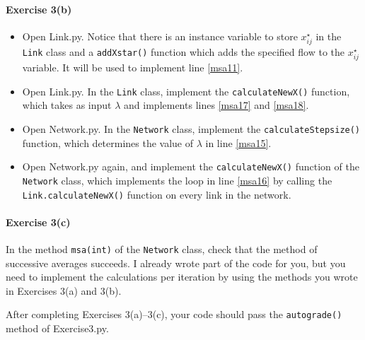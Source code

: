 \documentclass[11pt]{article}
\begin{document}
\paragraph*{Exercise 3(b)} 
\begin{itemize}
	\item Open Link.py. Notice that there is an instance variable to store $x^\star_{ij}$ in the \texttt{Link} class and a \texttt{addXstar()} function which adds the specified flow to the $x^\star_{ij}$ variable.
	It will be used to implement line \ref{msa11}. 
	
	
	
	\item Open Link.py. In the \texttt{Link} class, implement the \texttt{calculateNewX()} function, which takes as input $\lambda$ and implements lines \ref{msa17} and \ref{msa18}. 
	
	\item Open Network.py. In the \texttt{Network} class, implement the \texttt{calculateStepsize()} function, which determines the value of $\lambda$ in line \ref{msa15}. 
	
	\item Open Network.py again, and implement the \texttt{calculateNewX()} function of the \texttt{Network} class, which implements the loop in line \ref{msa16} by calling the \texttt{Link.calculateNewX()} function on every link in the network.
\end{itemize}


\paragraph*{Exercise 3(c)} 

In the method \texttt{msa(int)} of the \texttt{Network} class, check that  the method of successive averages succeeds. I already wrote part of the code for you, but you need to implement the calculations per iteration by using the methods you wrote in Exercises 3(a) and 3(b).


\vspace\baselineskip

	\noindent
	After completing Exercises 3(a)--3(c), your code should pass the \texttt{autograde()} method of Exercise3.py. 
	
	
	
	
	
\end{document}
